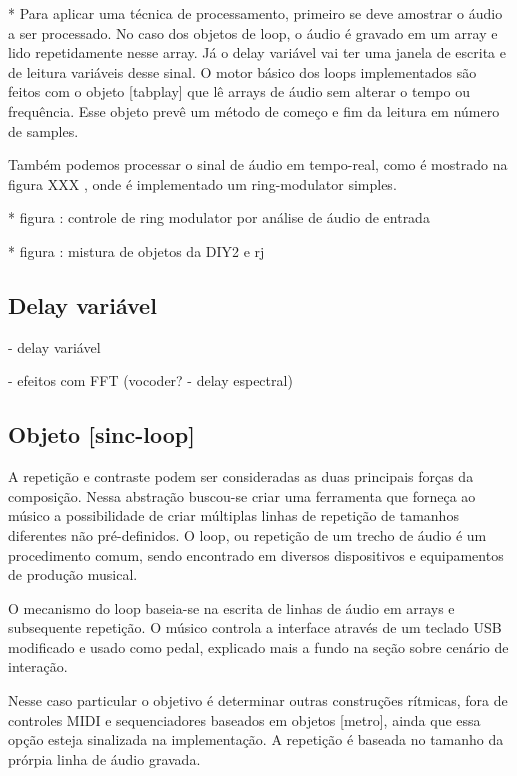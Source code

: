 \documentclass[draft]{ppgmus}
\begin{document}
* Para aplicar uma técnica de processamento, primeiro se deve amostrar
o áudio a ser processado. No caso dos objetos de loop, o áudio é gravado
em um array e lido repetidamente nesse array. Já o delay variável vai ter uma
janela de escrita e de leitura variáveis desse sinal. O motor básico dos loops 
implementados são feitos com o objeto [tabplay\texttildelow] que lê arrays
de áudio sem alterar o tempo ou frequência. Esse objeto prevê um método de começo e fim
da leitura em número de samples.

Também podemos processar o sinal de áudio em tempo-real, como é mostrado na 
figura XXX , onde é implementado um ring-modulator simples.



* figura : controle de ring modulator por análise de áudio de entrada

* figura : mistura de objetos da DIY2 e rj


\subsection{Delay variável}


- delay variável

- efeitos com FFT (vocoder? - delay espectral)



\subsection{Objeto [sinc-loop]}


A repetição e contraste podem ser consideradas as duas principais forças
da composição. Nessa abstração buscou-se criar uma ferramenta que forneça ao músico 
a possibilidade de criar múltiplas linhas de repetição de tamanhos diferentes não pré-definidos.
O loop, ou repetição de um trecho de áudio é um procedimento comum,
sendo encontrado em diversos dispositivos e equipamentos de produção musical.


O mecanismo do loop baseia-se na escrita de linhas de áudio em arrays e subsequente
repetição. O músico controla a interface através de um teclado USB modificado e 
usado como pedal, explicado mais a fundo na seção sobre cenário de interação.

Nesse caso particular o objetivo é determinar outras construções rítmicas,
fora de controles MIDI e sequenciadores baseados em objetos [metro], ainda que essa opção
esteja sinalizada na implementação. A repetição
é baseada no tamanho da prórpia linha de áudio gravada.
\end{document}
